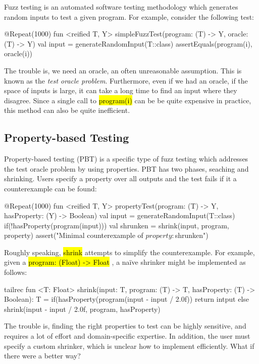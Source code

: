 \documentclass[12pt,initial,twoside,maitrise]{dms}
\newcommand{\inline}[1]{%
\begingroup%
\sethlcolor{slightgray}%
\hl{\ttfamily\small #1}%
\endgroup
}
\numberwithin{equation}{section}
\numberwithin{table}{chapter}
\numberwithin{figure}{chapter}
\begin{document}
Fuzz testing is an automated software testing methodology which generates random inputs to test a given program. For example, consider the following test:
%
\begin{kotlinlisting}
@Repeat(1000)
fun <reified T, Y> simpleFuzzTest(program: (T) -> Y, oracle: (T) -> Y) {
        val input = generateRandomInput(T::class)
        assertEquals(program(i), oracle(i))
}
\end{kotlinlisting}
%
The trouble is, we need an oracle, an often unreasonable assumption. This is known as the \textit{test oracle problem}. Furthermore, even if we had an oracle, if the space of inputs is large, it can take a long time to find an input where they disagree. Since a single call to \inline{program(i)} can be be quite expensive in practice, this method can also be quite inefficient.

\subsection{Property-based Testing}\label{subsec:property-based-testing}

Property-based testing (PBT) is a specific type of fuzz testing which addresses the test oracle problem by using properties. PBT has two phases, seaching and shrinking. Users specify a property over all outputs and the test fails if it a counterexample can be found:
%
\begin{kotlinlisting}
@Repeat(1000)
fun <reified T, Y> propertyTest(program: (T) -> Y, hasProperty: (Y) -> Boolean) {
    val input = generateRandomInput(T::class)
    if(!hasProperty(program(input))) {
        val shrunken = shrink(input, program, property)
        assert("Minimal counterexample of $property: $shrunken")
    }
}
\end{kotlinlisting}
%
Roughly speaking, \inline{shrink} attempts to simplify the counterexample. For example, given a \inline{program: (Float) -> Float}, a na\"ive shrinker might be implemented as follows:
%
\begin{kotlinlisting}
tailrec fun <T: Float> shrink(input: T, program: (T) -> T, hasProperty: (T) -> Boolean): T =
    if(hasProperty(program(input - input / 2.0f)) return intput
    else shrink(input - input / 2.0f, program, hasProperty)
\end{kotlinlisting}
%
The trouble is, finding the right properties to test can be highly sensitive, and requires a lot of effort and domain-specific expertise. In addition, the user must specify a custom shrinker, which is unclear how to implement efficiently. What if there were a better way?
\end{document}
